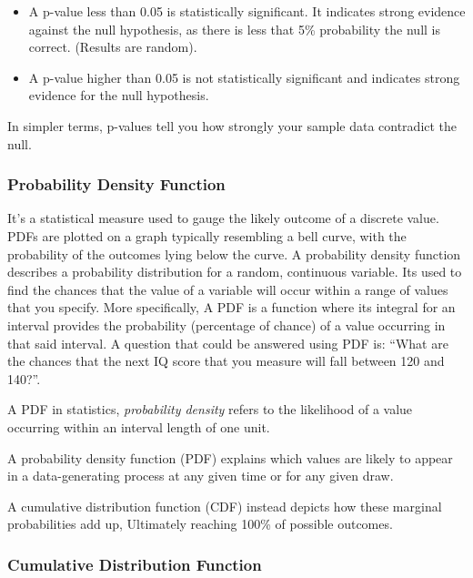 \documentclass[11pt]{article}
\begin{document}
\begin{itemize}
\item
  A p-value less than 0.05 is statistically significant. It indicates
  strong evidence against the null hypothesis, as there is less that 5\%
  probability the null is correct. (Results are random).
\item
  A p-value higher than 0.05 is not statistically significant and
  indicates strong evidence for the null hypothesis.
\end{itemize}

In simpler terms, p-values tell you how strongly your sample data
contradict the null.

\hypertarget{probability-density-function}{%
\subsubsection{Probability Density
Function}\label{probability-density-function}}

It's a statistical measure used to gauge the likely outcome of a
discrete value. PDFs are plotted on a graph typically resembling a bell
curve, with the probability of the outcomes lying below the curve. A
probability density function describes a probability distribution for a
random, continuous variable. Its used to find the chances that the value
of a variable will occur within a range of values that you specify. More
specifically, A PDF is a function where its integral for an interval
provides the probability (percentage of chance) of a value occurring in
that said interval. A question that could be answered using PDF is:
``What are the chances that the next IQ score that you measure will fall
between 120 and 140?''.

A PDF in statistics, \emph{probability density} refers to the likelihood
of a value occurring within an interval length of one unit.

A probability density function (PDF) explains which values are likely to
appear in a data-generating process at any given time or for any given
draw.

A cumulative distribution function (CDF) instead depicts how these
marginal probabilities add up, Ultimately reaching 100\% of possible
outcomes.

\hypertarget{cumulative-distribution-function}{%
\subsubsection{Cumulative Distribution
Function}\label{cumulative-distribution-function}}
\end{document}
